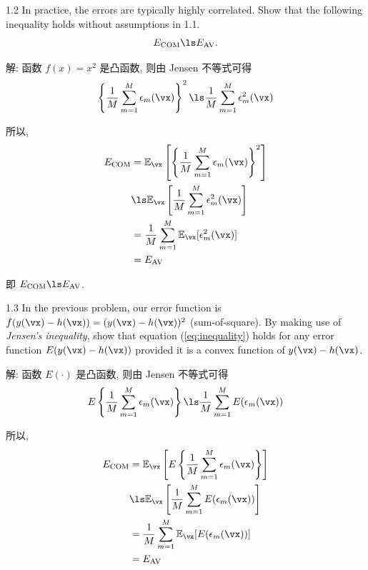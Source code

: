 \documentclass[openany]{ctexbook}
\theoremstyle{kaiti}
\theoremstyle{normal}
\begin{document}
1.2 In practice, the errors are typically highly correlated. Show that the following inequality holds without assumptions in 1.1.
\begin{equation}
  E_{\text{COM}}\ls E_{\text{AV}}.
  \label{eq:inequality}
\end{equation}

解: 函数 $f(x)=x^2$ 是凸函数, 则由 Jensen 不等式可得
\begin{equation}
  \left\{\frac{1}{M}\sum_{m=1}^{M}\epsilon_{m}(\vx)\right\}^{2}
  \ls
  \frac{1}{M}\sum_{m=1}^{M}\epsilon^{2}_{m}(\vx)
\end{equation}

所以,
\begin{equation}
  \begin{aligned}
    E_{\text{COM}}
    &=\mathbb{E}_{\vx}\left[\left\{\frac{1}{M}\sum_{m=1}^{M}\epsilon_{m}(\vx)\right\}^{2}\right]\\
    &\ls\mathbb{E}_{\vx}\left[\frac{1}{M}\sum_{m=1}^{M}\epsilon^{2}_{m}(\vx)\right]\\
    &=\frac{1}{M}\sum_{m=1}^{M}\mathbb{E}_{\vx}[\epsilon^{2}_{m}(\vx)]\\
    &=E_{\text{AV}}
  \end{aligned}
\end{equation}

即 $E_{\text{COM}}\ls E_{\text{AV}}$.

1.3 In the previous problem, our error function is $f(y(\vx)-h(\vx))=(y(\vx)-h(\vx))^{2}$ (sum-of-square). By making use of \emph{Jensen's inequality}, show that equation (\ref{eq:inequality}) holds for any error function $E(y(\vx)-h(\vx))$ provided it is a convex function of $y(\vx)-h(\vx)$.

解: 函数 $E(\cdot)$ 是凸函数, 则由 Jensen 不等式可得
\begin{equation}
  E\left\{\frac{1}{M}\sum_{m=1}^{M}\epsilon_{m}(\vx)\right\}
  \ls
  \frac{1}{M}\sum_{m=1}^{M}E(\epsilon_{m}(\vx))
\end{equation}

所以,
\begin{equation}
  \begin{aligned}
    E_{\text{COM}}
    &=\mathbb{E}_{\vx}\left[E\left\{\frac{1}{M}\sum_{m=1}^{M}\epsilon_{m}(\vx)\right\}\right]\\
    &\ls\mathbb{E}_{\vx}\left[\frac{1}{M}\sum_{m=1}^{M}E(\epsilon_{m}(\vx))\right]\\
    &=\frac{1}{M}\sum_{m=1}^{M}\mathbb{E}_{\vx}[E(\epsilon_{m}(\vx))]\\
    &=E_{\text{AV}}
  \end{aligned}
\end{equation}
\end{document}
